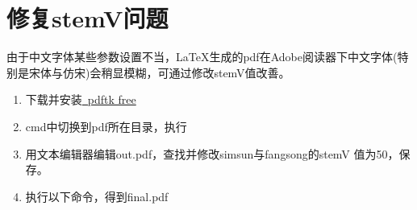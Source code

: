 \documentclass[twoside,longtitle]{LZUthesis}
\begin{document}
\section{修复stemV问题}

由于中文字体某些参数设置不当，\LaTeX{}生成的pdf在Adobe阅读器下中文字体(特别是宋体与仿宋)会稍显模糊，可通过修改stemV值改善。
\begin{enumerate}
\item 下载并安装\href{https://www.pdflabs.com/tools/pdftk-the-pdf-toolkit/}
{~pdftk free}
\item cmd中切换到pdf所在目录，执行



\item 用文本编辑器编辑out.pdf，查找并修改simsun与fangsong的stemV 值为50，保存。
\item 执行以下命令，得到final.pdf



\end{enumerate}
\end{document}
